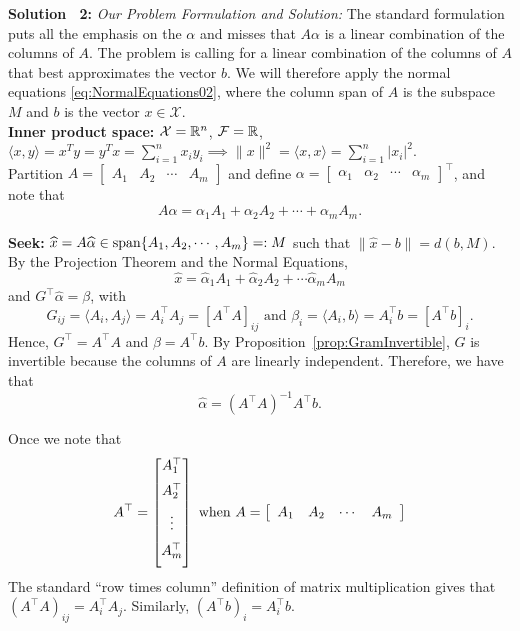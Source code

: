 \textbf{Solution ~2:} \emph{Our Problem Formulation and Solution:} The standard formulation puts all the emphasis on the $\alpha$ and misses that $A \alpha $ is a linear combination of the columns of $A$. The problem is calling for a linear combination of the columns of $A$ that best approximates the vector $b$.  We will therefore apply the normal equations \eqref{eq:NormalEquations02}, where the column span of $A$ is the subspace $M$ and $b$ is the vector $x \in \mathcal{X}$.\\

\textbf{Inner product space:} ${\cal X}=\mathbb R ^n$, ${\cal F}=\mathbb R$, $\langle x,y \rangle = x^T y= y^T x= \sum\limits_{i=1}^n x_i y_i \implies \|x\|^2= \langle x,x \rangle =\sum\limits_{i=1}^n |x_i|^2.$\\


Partition $A=\left[ \begin{array}{cccc} A_1 & A_2 & \cdots & A_m \end{array} \right]$ and define $\alpha = \left[ \begin{array}{cccc}\alpha_1 & \alpha_2 &  \cdots & \alpha_m \end{array} \right]^\top$, and note that
$$ A \alpha = \alpha_1 A_1 + \alpha_2 A_2 + \cdots + \alpha_m A_m.$$

\textbf{Seek:} $\widehat{x} = A \widehat{\alpha} \in \mathrm{span} \{  A_1,A_2, \cdots, A_m  \} =: M$
such that  $\|\widehat{x}-b\|=d(b,M).$ By the Projection Theorem and the Normal Equations,
$$\widehat{x}=\widehat{\alpha}_1 A_1 +\widehat{\alpha}_2 A_2 + \cdots \widehat{\alpha}_m A_m $$
and $G^\top \widehat{\alpha}=\beta$, with
$$G_{ij}= \langle A_i,A_j \rangle =A_i ^\top A_j = [A^\top A]_{ij} \text{ and } \beta_i =  \langle A_i, b \rangle  =  A_i^\top b = [A^\top b]_i.$$
Hence, $G^\top = A^\top A$ and $\beta = A^\top b$. By  Proposition~\ref{prop:GramInvertible}, $G$ is invertible because the columns of $A$ are linearly independent. Therefore, we have that
$$\widehat{\alpha}=(A^\top A)^{-1} A^\top b.$$
\Qed

\begin{rem} Once we note that 
$$A^\top=\begin{bmatrix} A_1^\top \medskip \\ A_2^\top \medskip\\ \vdots \medskip\\ A_m^\top \medskip \end{bmatrix} \text{ when } A= \left[ \begin{array}{cccc} A_1 & A_2 & \cdots & A_m \end{array} \right]$$ 
The standard ``row times column'' definition of matrix multiplication gives that $(A^\top A)_{ij}=A^\top_i A_j$. Similarly, $(A^\top b)_i=A_i^\top b$. 
\end{rem}


